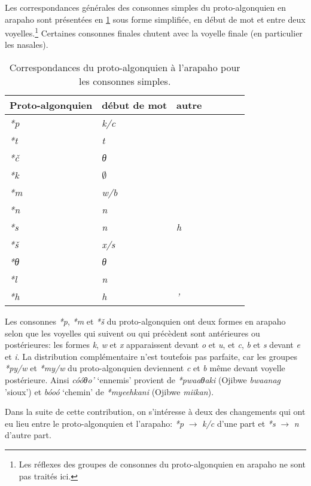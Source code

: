 \documentclass[twoside,a4paper,11pt]{article}
\newcommand{\ipa}[1]{{\phon\textit{#1}}}
\newcommand{\Σ}{\greek{Σ}}
\begin{document}
Les correspondances générales des consonnes simples du proto-algonquien en arapaho sont présentées en \ref{tab:c.simple.arapaho} sous forme simplifiée, en début de mot et entre deux voyelles.\footnote{Les réflexes des groupes de consonnes du proto-algonquien en arapaho ne sont pas traités ici.} Certaines consonnes finales chutent avec la voyelle finale (en particulier les nasales).
 \begin{table}[h]
\caption{Correspondances du proto-algonquien à l'arapaho pour les consonnes simples.} \centering  \label{tab:c.simple.arapaho}
\begin{tabular}{lllllll}
\toprule
Proto-algonquien & début de mot  & autre \\
\midrule
\ipa{*p} & 	\ipa{k/c} & 	&   	\\
\ipa{*t} & 	\ipa{t} & 	 & 	  	\\
\ipa{*č} & 	\ipa{θ} & 	   	\\
\ipa{*k} & 	$\emptyset$ & 	   	\\
\ipa{*m} & 	\ipa{w/b} & 	 & 	  	\\
\ipa{*n} & 	\ipa{n} & 	 & 	  	\\
\ipa{*s} & 	\ipa{n} & 	\ipa{h} & 	  	\\
\ipa{*š} & 	\ipa{x/s} & 	 & 	  & 	\\
\ipa{*θ} & 	\ipa{θ} &  & 	  	\\
\ipa{*l} & 	\ipa{n} &  & 	  	\\
\ipa{*h} & 	\ipa{h} & 	\ipa{'} & 	  	\\
\bottomrule
\end{tabular}
\end{table}

Les consonnes \ipa{*p}, \ipa{*m} et \ipa{*š} du proto-algonquien ont deux formes en arapaho selon que les voyelles qui suivent ou qui précèdent sont antérieures ou postérieures: les formes \ipa{k}, \ipa{w} et \ipa{x} apparaissent devant \ipa{o} et \ipa{u}, et \ipa{c}, \ipa{b} et \ipa{s} devant \ipa{e} et \ipa{i}. La distribution complémentaire n'est toutefois pas parfaite, car les groupes \ipa{*py/w} et \ipa{*my/w} du proto-algonquien deviennent \ipa{c} et \ipa{b} même devant voyelle postérieure. Ainsi \ipa{cóóθo'} `ennemis' provient de \ipa{*pwaaθaki} (Ojibwe \ipa{bwaanag} 'sioux') et \ipa{bóoó} `chemin' de \ipa{*myeehkani} (Ojibwe \ipa{miikan}).

Dans la suite de cette contribution, on s'intéresse à deux des changements qui ont eu lieu entre le proto-algonquien et l'arapaho: \ipa{*p} $\rightarrow$ \ipa{k/c} d'une part et \ipa{*s} $\rightarrow$ \ipa{n} d'autre part.
\end{document}
